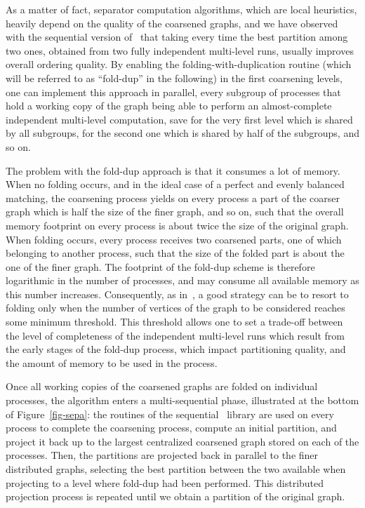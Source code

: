 \documentclass[fleqn,12pt,twoside]{article}
\begin{document}
As a matter of fact, separator computation algorithms, which are local
heuristics, heavily depend on the quality of the coarsened graphs,
and we have observed with the sequential version of \scotch\ that
taking every time the best partition among two ones, obtained from
two fully independent multi-level runs, usually improves overall ordering
quality. By enabling the folding-with-duplication routine (which will
be referred to as ``fold-dup'' in the following) in the first
coarsening levels, one can implement this approach in parallel, every
subgroup of processes that hold a working copy of the graph being
able to perform an almost-complete independent multi-level
computation, save for the very first level which is shared by all
subgroups, for the second one which is shared by half of the subgroups,
and so on.

The problem with the fold-dup approach is that it
consumes a lot of memory. When no folding occurs, and in the ideal
case of a perfect and evenly balanced matching, the coarsening process
yields on every process a part of the coarser graph which is half
the size of the finer graph, and so on, such that the overall memory
footprint on every process is about twice the size of the original
graph. When folding occurs, every process receives two coarsened
parts, one of which belonging to another process, such that the size
of the folded part is about the one of the finer graph. The footprint
of the fold-dup scheme is therefore logarithmic in the
number of processes, and may consume all available memory as this
number increases. Consequently, as in~\cite{ParMetis}, a good strategy
can be to resort to folding only when the number of vertices of the
graph to be considered reaches some minimum threshold. This threshold
allows one to set a trade-off between the level of completeness of the
independent multi-level runs which result from the early stages of the
fold-dup process, which impact partitioning quality,
and the amount of memory to be used in the process.

Once all working copies of the coarsened graphs are folded on
individual processes, the algorithm enters a multi-sequential phase,
illustrated at the bottom of Figure~\ref{fig-sepa}: the routines of
the sequential \scotch\ library are used on every process to
complete the coarsening process, compute an initial partition, and
project it back up to the largest centralized coarsened graph stored
on each of the processes. Then, the partitions are projected back in
parallel to the finer distributed graphs, selecting the best partition
between the two available when projecting to a level where fold-dup
had been performed. This distributed projection process is repeated
until we obtain a partition of the original graph.
\end{document}
